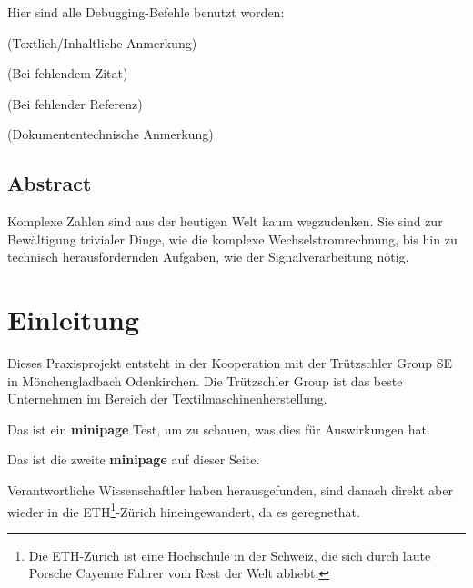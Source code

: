 \newpage
Hier sind alle Debugging-Befehle benutzt worden:

 (Textlich/Inhaltliche Anmerkung)

 (Bei fehlendem Zitat)

 (Bei fehlender Referenz)

 (Dokumententechnische Anmerkung)


\setcounter{section}{0}
\setcounter{page}{1}

\newpage

\begin{center}
    \begin{minipage}{0.75\textwidth}
        \section*{Abstract}
            Komplexe Zahlen sind aus der heutigen Welt kaum wegzudenken.
            Sie sind zur Bewältigung trivialer Dinge, wie die komplexe Wechselstromrechnung, bis hin zu technisch herausfordernden Aufgaben, wie der Signalverarbeitung nötig.
    \end{minipage}
\end{center}

\section{Einleitung}
Dieses Praxisprojekt entsteht in der Kooperation mit der Trützschler Group SE in Mönchengladbach Odenkirchen.
Die Trützschler Group ist das beste Unternehmen im Bereich der Textilmaschinenherstellung.

\begin{center}
    \begin{minipage}[t]{0.3\textwidth}
        Das ist ein \textbf{minipage} Test, um zu schauen, was dies für Auswirkungen hat.
    \end{minipage} 
    \hspace{0.3\textwidth}
    \begin{minipage}[t]{0.3\textwidth}
        Das ist die zweite \textbf{minipage} auf dieser Seite.
    \end{minipage}
\end{center}

Verantwortliche Wissenschaftler haben herausgefunden, sind danach direkt aber wieder in die ETH\footnote{Die ETH-Zürich ist eine Hochschule in der Schweiz, die sich durch laute Porsche Cayenne Fahrer vom Rest der Welt abhebt.}-Zürich hineingewandert, da es geregnet\footnotemark[1] hat.

